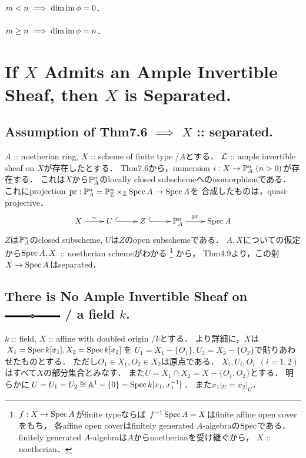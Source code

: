 \documentclass[a4paper]{jsarticle}
\begin{document}
    \paragraph{$m<n \implies \dim \operatorname{im} \phi=0$.}
    \paragraph{$m \geq n \implies \dim \operatorname{im} \phi=n$.}

\section{If $X$ Admits an Ample Invertible Sheaf, then $X$ is Separated.} %
    \subsection{Assumption of Thm7.6 $\implies$ $X$ :: separated.}
    $A$ :: noetherian ring,
    $X$ :: scheme of finite type /$A$とする．
    $\mathcal{L}$ :: ample invertible sheaf on $X$が存在したとする．
    Thm7.6から，immersion $i: X \to \mathbb{P}^n_A ~(n>0)$が存在する．
    これは$X$から$\mathbb{P}^n_A$のlocally closed subschemeへのisomorphismである．
    これにprojection $\operatorname{pr}: \mathbb{P}^n_A=\mathbb{P}^n_{\mathbb{Z}} \times_{\mathbb{Z}} \operatorname{Spec} A \to \operatorname{Spec} A$を
    合成したものは，quasi-projective．
    \[\xymatrix
    {
        X \ar[r]^-{\sim}& U ~\ar@{^{(}->}[r]& Z ~\ar@{^{(}->}[r]& \proj^n_A \ar[r]^-{\pr}& \Spec A
    }\]
    $Z$は$\mathbb{P}^n_A$のclosed subscheme,
    $U$は$Z$のopen subschemeである．
    $A,X$についての仮定から$\operatorname{Spec} A, X$ :: noetherian schemeがわかる
    \footnote
    {
        $f: X \to \operatorname{Spec} A$がfinite typeならば
        $f^{-1}\operatorname{Spec} A=X$はfinite affine open coverをもち，
        各affine open coverはfinitely generated $A$-algebraの$\operatorname{Spec}$である．
        finitely generated $A$-algebraは$A$からnoetherianを受け継ぐから，
        $X$ :: noetherian．
    }
    から，
    Thm4.9より，この射$X \to \operatorname{Spec} A$はseparated．
    
    \subsection{There is No Ample Invertible Sheaf on 
        \protect\includegraphics[width=2.5cm]{./images/affine_with_doubled_origin2.eps} / a field $k$.}
    $k$ :: field,
    $X$ :: affine with doubled origin /$k$とする．
    より詳細に，$X$は$X_1=\operatorname{Spec} k[x_1], X_2=\operatorname{Spec} k[x_2]$を
    $U_1=X_1-\{O_1\}, U_2=X_2-\{O_2\}$で貼りあわせたものとする．
    ただし$O_1 \in X_1,O_2 \in X_2$は原点である．
    $X_i, U_i, O_i ~~(i=1,2)$はすべて$X$の部分集合とみなす．
    また$U=X_1 \cap X_2=X-\{O_1, O_2\}$とする．
    明らかに$U=U_1=U_2 \cong \mathbb{A}^1-\{0\}=\operatorname{Spec} k[x_1, x_1^{-1}]$．
    また$x_1|_U=x_2|_U$．
\end{document}
